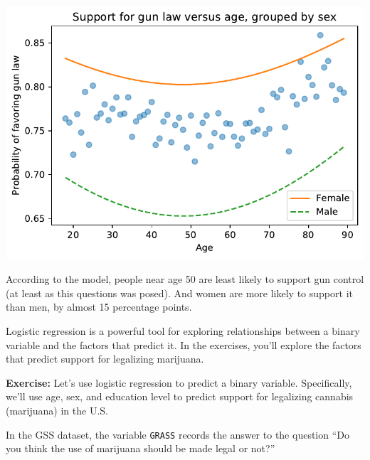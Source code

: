\begin{center}
\includegraphics[scale=0.75]{10_regression_files/10_regression_83_0.pdf}
\end{center}

According to the model, people near age 50 are least likely to support
gun control (at least as this questions was posed). And women are more
likely to support it than men, by almost 15 percentage points.

Logistic regression is a powerful tool for exploring relationships
between a binary variable and the factors that predict it. In the
exercises, you'll explore the factors that predict support for
legalizing marijuana.

\textbf{Exercise:} Let's use logistic regression to predict a binary
variable. Specifically, we'll use age, sex, and education level to
predict support for legalizing cannabis (marijuana) in the U.S.

In the GSS dataset, the variable \passthrough{\lstinline!GRASS!} records
the answer to the question ``Do you think the use of marijuana should be
made legal or not?''

